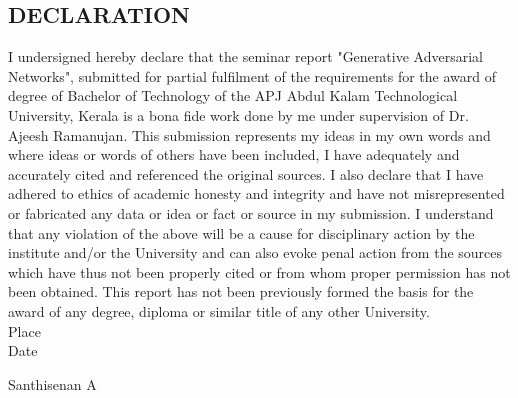 \begin{center}
    \section*{DECLARATION}
    \justify
    \begin{onehalfspace}
        I undersigned hereby declare that the seminar report 
        "Generative Adversarial Networks", submitted for partial fulfilment of 
        the requirements for the award of degree of Bachelor of Technology of 
        the APJ Abdul Kalam Technological University, Kerala is a bona fide work 
        done by me under supervision of Dr. Ajeesh Ramanujan. This submission 
        represents my ideas in my own words and where ideas or words of others 
        have been included, I have adequately and accurately cited and 
        referenced the original sources. I also declare that I have adhered to 
        ethics of academic honesty and integrity and have not misrepresented or 
        fabricated any data or idea or fact or source in my submission. I 
        understand that any violation of the above will be a cause for 
        disciplinary action by the institute and/or the University and can also 
        evoke penal action from the sources which have thus not been properly 
        cited or from whom proper permission has not been obtained. This report 
        has not been previously formed the basis for the award of any degree, 
        diploma or similar title of any other University.\\
        
        \noindent\textmd{Place}\\
        \textmd{Date}

        \begin{flushright}
            Santhisenan A
        \end{flushright}



    \end{onehalfspace}
\end{center}
